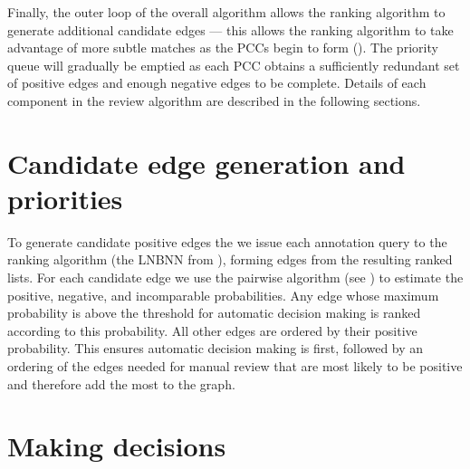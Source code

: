 Finally, the outer loop of the overall algorithm allows the ranking algorithm
  to generate additional candidate edges --- this allows the ranking algorithm
  to take advantage of more subtle matches as the PCCs begin to form
  ().
The priority queue will gradually be emptied as each PCC obtains a
  sufficiently redundant set of positive edges and enough negative edges to be
  complete.
Details of each component in the review algorithm are described in the
  following sections.




\section{Candidate edge generation and priorities}\label{sec:cand}

To generate candidate positive edges the we issue each annotation query to the
  ranking algorithm (the LNBNN from ), forming edges from
  the resulting ranked lists.
For each candidate edge we use the pairwise algorithm (see
  ) to estimate the positive, negative, and incomparable
  probabilities.
Any edge whose maximum probability is above the threshold for automatic
  decision making is ranked according to this probability.
All other edges are ordered by their positive probability.
This ensures automatic decision making is first, followed by an ordering of
  the edges needed for manual review that are most likely to be positive and
  therefore add the most to the graph.

\section{Making decisions}\label{sec:decision}



